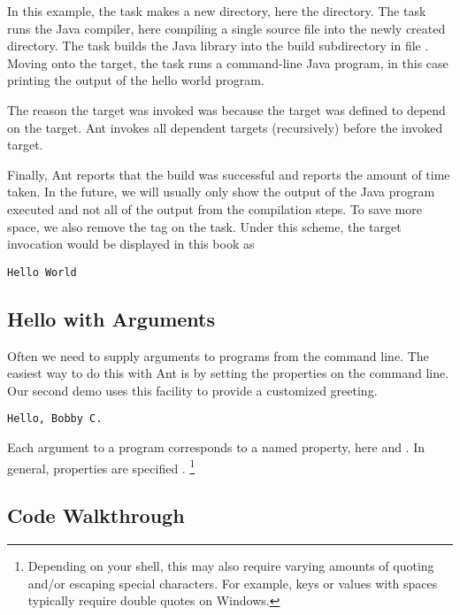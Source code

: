 In this example, the  task makes a new directory, here the 
 directory.  The  task runs the
Java compiler, here compiling a single source file into the
newly created directory.  The  task builds the Java
library into the build subdirectory  in file
.  Moving onto the  target,
the  task runs a command-line Java program, in this
case printing the output of the hello world program.

The reason the  target was invoked was because the
 target was defined to depend on the  target.
Ant invokes all dependent targets (recursively) before the invoked
target.

Finally, Ant reports that the build was successful and reports the
amount of time taken.  In the future, we will usually only show the
output of the Java program executed and not all of the output from the
compilation steps.  To save more space, we also remove the
\code{[java]} tag on the task.  Under this scheme, the 
target invocation would be displayed in this book as
%
\begin{verbatim}
Hello World
\end{verbatim}

\subsection{Hello with Arguments}

Often we need to supply arguments to programs from the command
line.  The easiest way to do this with Ant is by setting the
properties on the command line.  Our second demo uses this facility
to provide a customized greeting.
%
\begin{verbatim}
Hello, Bobby C.
\end{verbatim}
%
Each argument to a program corresponds to a named property, here
 and .  In general, properties are specified
.%
%
\footnote{Depending on your shell, this may also require varying
  amounts of quoting and/or escaping special characters.  For example,
  keys or values with spaces typically require double quotes on
  Windows.}


\subsection{Code Walkthrough}\label{section-intro-hello-code}

